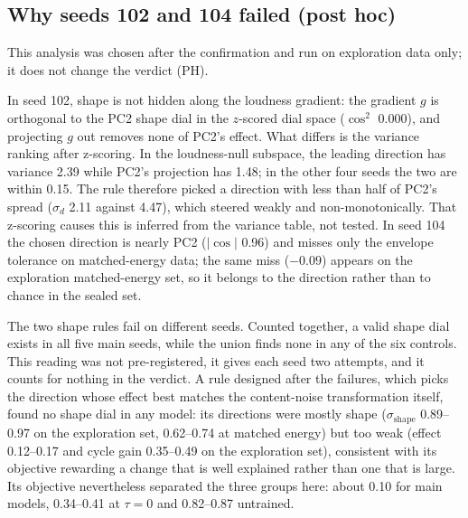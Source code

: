 \documentclass[10pt]{article}
\begin{document}
\subsection{Why seeds 102 and 104 failed (post hoc)}\label{sec:6.6}

This analysis was chosen after the confirmation and run on exploration data only; it does not change the verdict (PH).

In seed 102, shape is not hidden along the loudness gradient: the gradient $g$ is orthogonal to the PC2 shape dial in the $z$-scored dial space ($\cos^2$ 0.000), and projecting $g$ out removes none of PC2's effect. What differs is the variance ranking after z-scoring. In the loudness-null subspace, the leading direction has variance 2.39 while PC2's projection has 1.48; in the other four seeds the two are within 0.15. The rule therefore picked a direction with less than half of PC2's spread ($\sigma_d$ 2.11 against 4.47), which steered weakly and non-monotonically. That z-scoring causes this is inferred from the variance table, not tested. In seed 104 the chosen direction is nearly PC2 ($|\cos|$ 0.96) and misses only the envelope tolerance on matched-energy data; the same miss ($-0.09$) appears on the exploration matched-energy set, so it belongs to the direction rather than to chance in the sealed set.

The two shape rules fail on different seeds. Counted together, a valid shape dial exists in all five main seeds, while the union finds none in any of the six controls. This reading was not pre-registered, it gives each seed two attempts, and it counts for nothing in the verdict. A rule designed after the failures, which picks the direction whose effect best matches the content-noise transformation itself, found no shape dial in any model: its directions were mostly shape ($\sigma_{\mathrm{shape}}$ 0.89--0.97 on the exploration set, 0.62--0.74 at matched energy) but too weak (effect 0.12--0.17 and cycle gain 0.35--0.49 on the exploration set), consistent with its objective rewarding a change that is well explained rather than one that is large. Its objective nevertheless separated the three groups here: about 0.10 for main models, 0.34--0.41 at $\tau = 0$ and 0.82--0.87 untrained.
\end{document}
